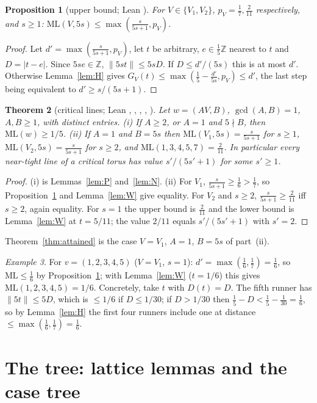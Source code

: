 \documentclass[11pt]{article}
\newtheorem{theorem}{Theorem}
\newtheorem{proposition}[theorem]{Proposition}
\theoremstyle{remark}
\newtheorem{example}[theorem]{Example}
\newcommand{\ML}{\mathrm{ML}}
\newcommand{\Z}{\mathbb{Z}}
\newcommand{\dist}[1]{\lVert #1\rVert}
\begin{document}
\begin{proposition}[upper bound; Lean ]\label{prop:U}
For $V\in\{V_1,V_2\}$, $p_V=\tfrac17,\tfrac2{11}$ respectively, and $s\ge1$: $\ML(V,5s)\le\max(\tfrac s{5s+1},p_V)$.
\end{proposition}
\begin{proof}
Let $d'=\max(\tfrac s{5s+1},p_V)$, let $t$ be arbitrary, $e\in\tfrac15\Z$ nearest to $t$ and $D=|t-e|$. Since $5se\in\Z$, $\dist{5st}\le5sD$. If $D\le d'/(5s)$ this is at most $d'$. Otherwise Lemma~\ref{lem:H} gives $G_V(t)\le\max(\tfrac15-\tfrac{d'}{5s},p_V)\le d'$, the last step being equivalent to $d'\ge s/(5s+1)$.
\end{proof}
\begin{theorem}[critical lines; Lean , , , , ]\label{thm:crit}
Let $w=(AV,B)$, $\gcd(A,B)=1$, $A,B\ge1$, with distinct entries. (i) If $A\ge2$, or $A=1$ and $5\nmid B$, then $\ML(w)\ge1/5$. (ii) If $A=1$ and $B=5s$ then $\ML(V_1,5s)=\tfrac s{5s+1}$ for $s\ge1$, $\ML(V_2,5s)=\tfrac s{5s+1}$ for $s\ge2$, and $\ML(1,3,4,5,7)=\tfrac2{11}$. In particular every near-tight line of a critical torus has value $s'/(5s'+1)$ for some $s'\ge1$.
\end{theorem}
\begin{proof}
(i) is Lemmas~\ref{lem:P} and~\ref{lem:N}. (ii) For $V_1$, $\tfrac s{5s+1}\ge\tfrac16>\tfrac17$, so Proposition~\ref{prop:U} and Lemma~\ref{lem:W} give equality. For $V_2$ and $s\ge2$, $\tfrac s{5s+1}\ge\tfrac2{11}$ iff $s\ge2$, again equality. For $s=1$ the upper bound is $\tfrac2{11}$ and the lower bound is Lemma~\ref{lem:W} at $t=5/11$; the value $2/11$ equals $s'/(5s'+1)$ with $s'=2$.
\end{proof}
Theorem~\ref{thm:attained} is the case $V=V_1$, $A=1$, $B=5s$ of part~(ii).

\begin{example}\label{ex:upper}
For $v=(1,2,3,4,5)$ ($V=V_1$, $s=1$): $d'=\max(\tfrac16,\tfrac17)=\tfrac16$, so $\ML\le\tfrac16$ by Proposition~\ref{prop:U}; with Lemma~\ref{lem:W} ($t=1/6$) this gives $\ML(1,2,3,4,5)=1/6$. Concretely, take $t$ with $D(t)=D$. The fifth runner has $\dist{5t}\le5D$, which is $\le1/6$ if $D\le1/30$; if $D>1/30$ then $\tfrac15-D<\tfrac15-\tfrac1{30}=\tfrac16$, so by Lemma~\ref{lem:H} the first four runners include one at distance $\le\max(\tfrac16,\tfrac17)=\tfrac16$.
\end{example}

\section{The tree: lattice lemmas and the case tree}\label{sec:tree}
\end{document}
